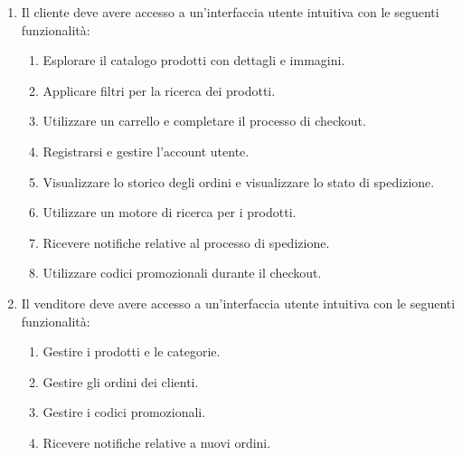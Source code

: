 \begin{enumerate}
    \item Il cliente deve avere accesso a un'interfaccia utente intuitiva con le seguenti funzionalità:
          \begin{enumerate}
              \item Esplorare il catalogo prodotti con dettagli e immagini.
              \item Applicare filtri per la ricerca dei prodotti.
              \item Utilizzare un carrello e completare il processo di checkout.
              \item Registrarsi e gestire l'account utente.
              \item Visualizzare lo storico degli ordini e visualizzare lo stato di spedizione.
              \item Utilizzare un motore di ricerca per i prodotti.
              \item Ricevere notifiche relative al processo di spedizione.
              \item Utilizzare codici promozionali durante il checkout.
          \end{enumerate}
    \item Il venditore deve avere accesso a un'interfaccia utente intuitiva con le seguenti funzionalità:
          \begin{enumerate}
              \item Gestire i prodotti e le categorie.
              \item Gestire gli ordini dei clienti.
              \item Gestire i codici promozionali.
              \item Ricevere notifiche relative a nuovi ordini.
          \end{enumerate}
\end{enumerate}